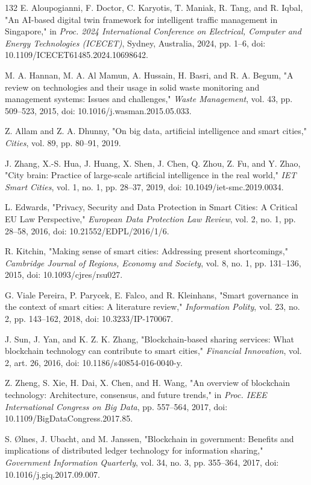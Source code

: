 \documentclass[pdflatex,sn-mathphys-num]{sn-jnl}%
\theoremstyle{thmstyleone}%
\theoremstyle{thmstyletwo}%
\theoremstyle{thmstylethree}%
\begin{document}
\begin{thebibliography}{132}
 E. Aloupogianni, F. Doctor, C. Karyotis, T. Maniak, R. Tang, and R. Iqbal, "An AI-based digital twin framework for intelligent traffic management in Singapore," in \emph{Proc. 2024 International Conference on Electrical, Computer and Energy Technologies (ICECET)}, Sydney, Australia, 2024, pp. 1--6, doi: 10.1109/ICECET61485.2024.10698642.

 M. A. Hannan, M. A. Al Mamun, A. Hussain, H. Basri, and R. A. Begum, "A review on technologies and their usage in solid waste monitoring and management systems: Issues and challenges," \emph{Waste Management}, vol. 43, pp. 509--523, 2015, doi: 10.1016/j.wasman.2015.05.033.

 Z. Allam and Z. A. Dhunny, "On big data, artificial intelligence and smart cities," \emph{Cities}, vol. 89, pp. 80--91, 2019.

 J. Zhang, X.-S. Hua, J. Huang, X. Shen, J. Chen, Q. Zhou, Z. Fu, and Y. Zhao, "City brain: Practice of large-scale artificial intelligence in the real world," \emph{IET Smart Cities}, vol. 1, no. 1, pp. 28--37, 2019, doi: 10.1049/iet-smc.2019.0034.

 L. Edwards, "Privacy, Security and Data Protection in Smart Cities: A Critical EU Law Perspective," \emph{European Data Protection Law Review}, vol. 2, no. 1, pp. 28--58, 2016, doi: 10.21552/EDPL/2016/1/6.

 R. Kitchin, "Making sense of smart cities: Addressing present shortcomings," \emph{Cambridge Journal of Regions, Economy and Society}, vol. 8, no. 1, pp. 131--136, 2015, doi: 10.1093/cjres/rsu027.

 G. Viale Pereira, P. Parycek, E. Falco, and R. Kleinhans, "Smart governance in the context of smart cities: A literature review," \emph{Information Polity}, vol. 23, no. 2, pp. 143--162, 2018, doi: 10.3233/IP-170067.

 J. Sun, J. Yan, and K. Z. K. Zhang, "Blockchain-based sharing services: What blockchain technology can contribute to smart cities," \emph{Financial Innovation}, vol. 2, art. 26, 2016, doi: 10.1186/s40854-016-0040-y.

 Z. Zheng, S. Xie, H. Dai, X. Chen, and H. Wang, "An overview of blockchain technology: Architecture, consensus, and future trends," in \emph{Proc. IEEE International Congress on Big Data}, pp. 557--564, 2017, doi: 10.1109/BigDataCongress.2017.85.

 S. \O{}lnes, J. Ubacht, and M. Janssen, "Blockchain in government: Benefits and implications of distributed ledger technology for information sharing," \emph{Government Information Quarterly}, vol. 34, no. 3, pp. 355--364, 2017, doi: 10.1016/j.giq.2017.09.007.


\end{thebibliography}
\end{document}
